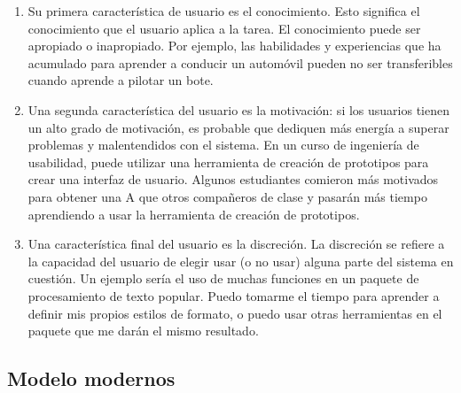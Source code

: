 \documentclass[11pt]{article}
\begin{document}
\begin{normalsize}
\begin{flushleft}
\begin{itemize}
                    \begin{itemize}
                    \begin{enumerate}
                        \item Su primera característica de usuario es el conocimiento. Esto significa el conocimiento que el usuario aplica a la tarea. El conocimiento puede ser apropiado o inapropiado. Por ejemplo, las habilidades y experiencias que ha acumulado para aprender a conducir un automóvil pueden no ser transferibles cuando aprende a pilotar un bote.
                        \break
                        \item Una segunda característica del usuario es la motivación: si los usuarios tienen un alto grado de motivación, es probable que dediquen más energía a superar problemas y malentendidos con el sistema. En un curso de ingeniería de usabilidad, puede utilizar una herramienta de creación de prototipos para crear una interfaz de usuario. Algunos estudiantes comieron más motivados para obtener una A que otros compañeros de clase y pasarán más tiempo aprendiendo a usar la herramienta de creación de prototipos. 
                        \break
                        \item Una característica final del usuario es la discreción. La discreción se refiere a la capacidad del usuario de elegir usar (o no usar) alguna parte del sistema en cuestión. Un ejemplo sería el uso de muchas funciones en un paquete de procesamiento de texto popular. Puedo tomarme el tiempo para aprender a definir mis propios estilos de formato, o puedo usar otras herramientas en el paquete que me darán el mismo resultado.

                    \end{enumerate}    
                    \end{itemize}
                
            \end{itemize}
	\subsection{Modelo modernos}

\end{flushleft}
\end{normalsize}
\end{document}
